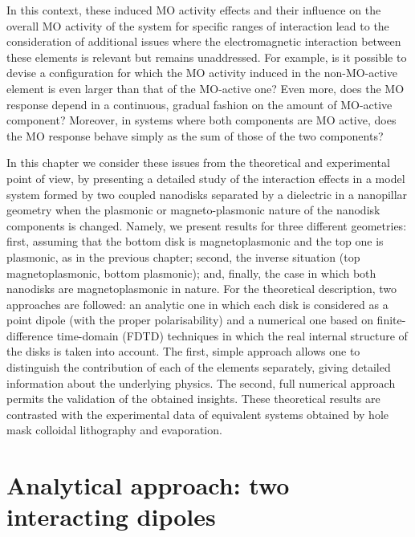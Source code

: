 In this context, these induced MO activity effects and their influence on the overall MO activity of the system for specific ranges of interaction lead to the consideration of additional issues where the electromagnetic interaction between these elements is relevant but remains unaddressed. For example, is it possible to devise a configuration for which the MO activity induced in the non-MO-active element is even larger than that of the MO-active one? Even more, does the MO response depend in a continuous, gradual fashion on the amount of MO-active component? Moreover, in systems where both components are MO active, does the MO response behave simply as the sum of those of the two components?

In this chapter we consider these issues from the theoretical and experimental point of view, by presenting a detailed study of the interaction effects in a model system formed by two coupled nanodisks separated by a dielectric in a nanopillar geometry when the plasmonic or magneto-plasmonic nature of the nanodisk components is changed. Namely, we present results for three different geometries: first, assuming that the bottom disk is magnetoplasmonic and the top one is plasmonic, as in the previous chapter; second, the inverse situation (top magnetoplasmonic, bottom plasmonic); and, finally, the case in which both nanodisks are magnetoplasmonic in nature. For the theoretical description, two approaches are followed: an analytic one in which each disk is considered as a point dipole (with the proper polarisability) and a numerical one based on finite-difference time-domain (FDTD) techniques in which the real internal structure of the disks is taken into account. The first, simple approach allows one to distinguish the contribution of each of the elements separately, giving detailed information about the underlying physics. The second, full numerical approach permits the validation of the obtained insights. These theoretical results are contrasted with the experimental data of equivalent systems obtained by hole mask colloidal lithography and evaporation.


\section{Analytical approach: two interacting dipoles\label{sec:chap4_Discretedipole}}

